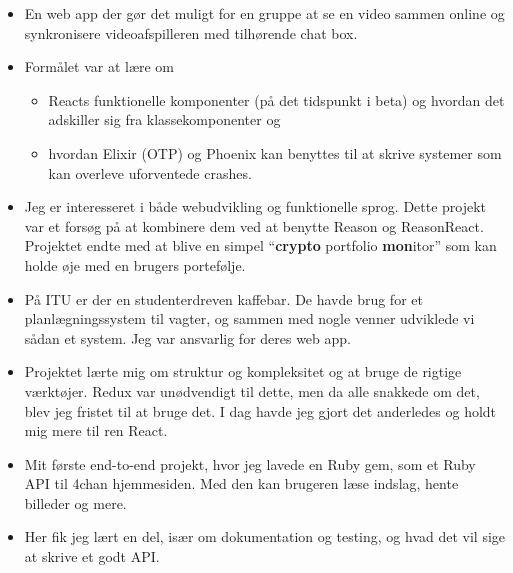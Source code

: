 \begin{itemize}
  \item En web app der gør det muligt for en gruppe at se en video sammen online
  og synkronisere videoafspilleren med tilhørende chat box.
  \item Formålet var at lære om
  \begin{itemize}
    \item Reacts funktionelle komponenter (på det tidspunkt i beta) og hvordan
    det adskiller sig fra klassekomponenter og
    \item hvordan Elixir (OTP) og Phoenix kan benyttes til at skrive systemer
    som kan overleve uforventede crashes.
  \end{itemize}
\end{itemize}
\begin{itemize}
  \item Jeg er interesseret i både webudvikling og funktionelle sprog. Dette
  projekt var et forsøg på at kombinere dem ved at benytte Reason og
  ReasonReact. Projektet endte med at blive en simpel ``\textbf{crypto} portfolio
  \textbf{mon}itor'' som kan holde øje med en brugers portefølje.
\end{itemize}
\smallskip
\smallskip
{}
\begin{itemize}
  \item På ITU er der en studenterdreven kaffebar. De havde brug for et
  planlægningssystem til vagter, og sammen med nogle venner udviklede vi sådan
  et system. Jeg var ansvarlig for deres web app.
  \item Projektet lærte mig om struktur og kompleksitet og at bruge de rigtige
  værktøjer. Redux var unødvendigt til dette, men da alle snakkede om det, blev
  jeg fristet til at bruge det. I dag havde jeg gjort det anderledes og holdt
  mig mere til ren React.
\end{itemize}
\smallskip
\smallskip
{}
\begin{itemize}
  \item Mit første end-to-end projekt, hvor jeg lavede en Ruby gem, som et Ruby
    API til 4chan hjemmesiden. Med den kan brugeren læse indslag, hente
    billeder og mere.
  \item Her fik jeg lært en del, især om dokumentation og testing, og hvad det
    vil sige at skrive et godt API.
\end{itemize}
